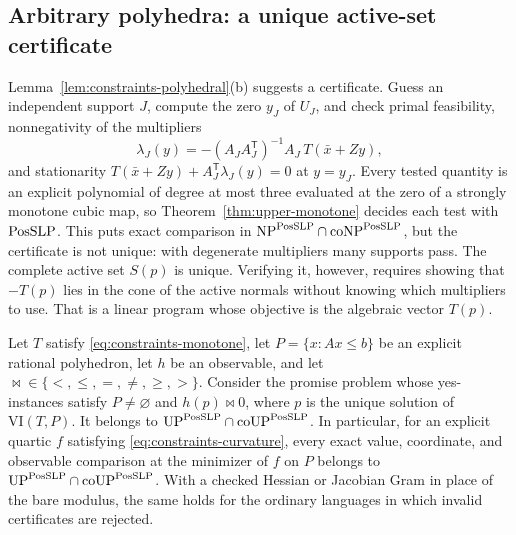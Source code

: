 \subsection{Arbitrary polyhedra: a unique active-set certificate}
\label{sec:constraints-general}

Lemma~\ref{lem:constraints-polyhedral}(b) suggests a certificate. Guess an
independent support $J$, compute the zero $y_J$ of $U_J$, and check primal
feasibility, nonnegativity of the multipliers
\begin{equation}\label{eq:constraints-multipliers}
 \lambda_J(y)=-(A_JA_J^{\mathsf T})^{-1}A_J\,T(\bar x+Zy),
\end{equation}
and stationarity $T(\bar x+Zy)+A_J^{\mathsf T}\lambda_J(y)=0$ at $y=y_J$.
Every tested quantity is an explicit polynomial of degree at most three
evaluated at the zero of a strongly monotone cubic map, so
Theorem~\ref{thm:upper-monotone} decides each test with $\mathrm{PosSLP}$. This puts
exact comparison in $\mathrm{NP}^{\mathrm{PosSLP}}\cap\mathrm{coNP}^{\mathrm{PosSLP}}$, but the
certificate is not unique: with degenerate multipliers many supports pass. The
complete active set $S(p)$ is unique. Verifying it, however, requires showing
that $-T(p)$ lies in the cone of the active normals without knowing which
multipliers to use. That is a linear program whose objective is the algebraic
vector $T(p)$.

\begin{theorem}
\label{thm:constraints-unambiguous}
Let $T$ satisfy \eqref{eq:constraints-monotone}, let $P=\{x:Ax\le b\}$ be an
explicit rational polyhedron, let $h$ be an observable, and let
${\bowtie}\in\{<,\le,=,\ne,\ge,>\}$. Consider the promise problem whose
yes-instances satisfy $P\ne\varnothing$ and $h(p)\bowtie0$, where $p$ is the
unique solution of $\mathrm{VI}(T,P)$. It belongs to
$\mathrm{UP}^{\mathrm{PosSLP}}\cap\mathrm{coUP}^{\mathrm{PosSLP}}$. In particular, for an
explicit quartic $f$ satisfying \eqref{eq:constraints-curvature}, every exact
value, coordinate, and observable comparison at the minimizer of $f$ on $P$
belongs to $\mathrm{UP}^{\mathrm{PosSLP}}\cap\mathrm{coUP}^{\mathrm{PosSLP}}$. With a checked
Hessian or Jacobian Gram in place of the bare modulus, the same holds for the
ordinary languages in which invalid certificates are rejected.
\end{theorem}

